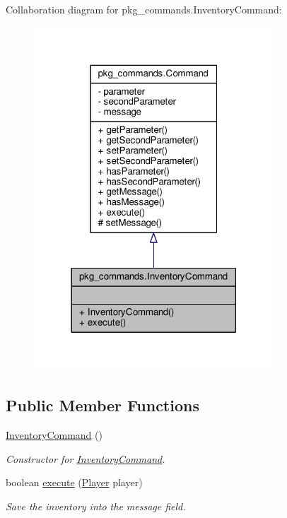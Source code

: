 Collaboration diagram for pkg\-\_\-commands.\-Inventory\-Command\-:
\nopagebreak
\begin{figure}[H]
\begin{center}
\leavevmode
\includegraphics[width=254pt]{classpkg__commands_1_1InventoryCommand__coll__graph}
\end{center}
\end{figure}
\subsection*{Public Member Functions}
\begin{DoxyCompactItemize}
\item 
\hyperlink{classpkg__commands_1_1InventoryCommand_a4ca959fe6979e5ca2a79a0596803533d}{Inventory\-Command} ()
\begin{DoxyCompactList}\small\item\em Constructor for \hyperlink{classpkg__commands_1_1InventoryCommand}{Inventory\-Command}. \end{DoxyCompactList}\item 
boolean \hyperlink{classpkg__commands_1_1InventoryCommand_a16ce9e3db461ecb7c4a50d2bdef65022}{execute} (\hyperlink{classpkg__world_1_1Player}{Player} player)
\begin{DoxyCompactList}\small\item\em Save the inventory into the message field. \end{DoxyCompactList}\end{DoxyCompactItemize}
